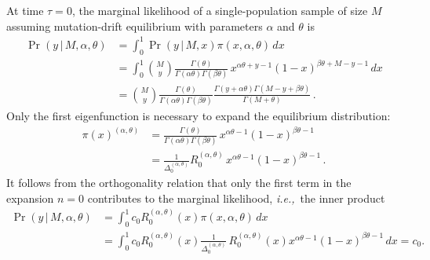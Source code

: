 \documentclass[preprint]{elsarticle}
\newcommand\given{{\,|\,}}
\newcommand\ie{{\it i.e.,}}
\begin{document}
At time $\tau=0$, the marginal likelihood of a single-population sample of size $M$ assuming mutation-drift equilibrium with parameters $\alpha$ and $\theta$ is
\begin{equation}
\begin{split}
    \Pr(y\given M,\alpha,\theta)
    &=\int_0^1 \Pr(y\given M,x) \pi(x,\alpha,\theta)\,dx\\
    &=\int_0^1 \binom{M}{y}\frac{\Gamma(\theta)}{\Gamma(\alpha\theta)\Gamma(\beta\theta)}\,x^{\alpha\theta+y-1}(1-x)^{\beta\theta+M-y-1}\,dx\\
    &=\binom{M}{y}\frac{\Gamma(\theta)}{\Gamma(\alpha\theta)\Gamma(\beta\theta)}
    \frac{\Gamma(y+\alpha\theta)\Gamma(M-y+\beta\theta)}{\Gamma(M+\theta)}\,.
\end{split}
\end{equation}
Only the first eigenfunction is necessary to expand the equilibrium distribution:
\begin{equation}
\begin{split}
    \pi(x)^{(\alpha,\theta)}&=\frac{\Gamma(\theta)}{\Gamma(\alpha\theta)\Gamma(\beta\theta)}\,x^{\alpha\theta-1}(1-x)^{\beta\theta-1}\\
    &=\frac{1}{\Delta_0^{(\alpha,\theta)}}R_0^{(\alpha,\theta)}\,x^{\alpha\theta-1}(1-x)^{\beta\theta-1}\,.
\end{split}
\end{equation}
It follows from the orthogonality relation that only the first term in the expansion $n=0$ contributes to the marginal likelihood, \ie\ the inner product
\begin{equation}
\begin{split}
    \Pr(y\given M,\alpha,\theta)&=\int_0^1 c_0 R_0^{(\alpha,\theta)}(x) \pi(x,\alpha,\theta)\,dx\\
    &=\int_0^1 c_0 R_0^{(\alpha,\theta)}(x) \frac{1}{\Delta_0^{(\alpha,\theta)}}\,R_0^{(\alpha,\theta)}(x) x^{\alpha\theta-1}(1-x)^{\beta\theta-1}\,dx
    =c_0.
\end{split}
\end{equation}
\end{document}
